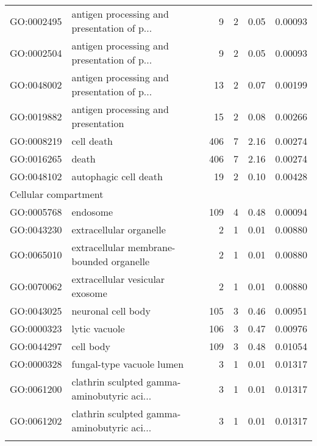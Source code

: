 \begin{longtable}{lp{5cm}rrrl}
  GO:0002495 & antigen processing and presentation of p... &   9 &   2 & 0.05 & 0.00093 \\ 
  GO:0002504 & antigen processing and presentation of p... &   9 &   2 & 0.05 & 0.00093 \\ 
  GO:0048002 & antigen processing and presentation of p... &  13 &   2 & 0.07 & 0.00199 \\ 
  GO:0019882 & antigen processing and presentation &  15 &   2 & 0.08 & 0.00266 \\ 
  GO:0008219 & cell death & 406 &   7 & 2.16 & 0.00274 \\ 
  GO:0016265 & death & 406 &   7 & 2.16 & 0.00274 \\ 
  GO:0048102 & autophagic cell death &  19 &   2 & 0.10 & 0.00428 \\ 
  \hline
  \multicolumn{6}{l}{Cellular compartment}  \\ 
  GO:0005768 & endosome & 109 &   4 & 0.48 & 0.00094 \\ 
  GO:0043230 & extracellular organelle &   2 &   1 & 0.01 & 0.00880 \\ 
  GO:0065010 & extracellular membrane-bounded organelle &   2 &   1 & 0.01 & 0.00880 \\ 
  GO:0070062 & extracellular vesicular exosome &   2 &   1 & 0.01 & 0.00880 \\ 
  GO:0043025 & neuronal cell body & 105 &   3 & 0.46 & 0.00951 \\ 
  GO:0000323 & lytic vacuole & 106 &   3 & 0.47 & 0.00976 \\ 
  GO:0044297 & cell body & 109 &   3 & 0.48 & 0.01054 \\ 
  GO:0000328 & fungal-type vacuole lumen &   3 &   1 & 0.01 & 0.01317 \\ 
  GO:0061200 & clathrin sculpted gamma-aminobutyric aci... &   3 &   1 & 0.01 & 0.01317 \\ 
  GO:0061202 & clathrin sculpted gamma-aminobutyric aci... &   3 &   1 & 0.01 & 0.01317 \\ 
  \hline\\
\end{longtable}


